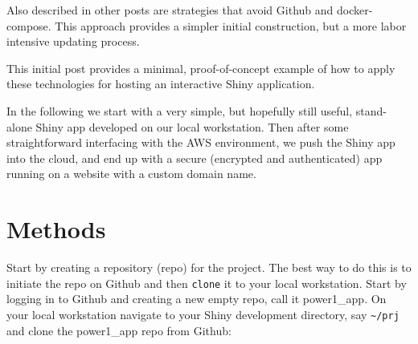 \documentclass[
  letterpaper,
  DIV=11,
  numbers=noendperiod,
  oneside]{scrartcl}
\begin{document}
Also described in other posts are strategies that avoid Github and
docker-compose. This approach provides a simpler initial construction,
but a more labor intensive updating process.

This initial post provides a minimal, proof-of-concept example of how to
apply these technologies for hosting an interactive Shiny application.

In the following we start with a very simple, but hopefully still
useful, stand-alone Shiny app developed on our local workstation. Then
after some straightforward interfacing with the AWS environment, we push
the Shiny app into the cloud, and end up with a secure (encrypted and
authenticated) app running on a website with a custom domain name.

\hypertarget{methods}{%
\section{Methods}\label{methods}}

Start by creating a repository (repo) for the project. The best way to
do this is to initiate the repo on Github and then \texttt{clone} it to
your local workstation. Start by logging in to Github and creating a new
empty repo, call it power1\_app. On your local workstation navigate to
your Shiny development directory, say \texttt{\textasciitilde{}/prj} and
clone the power1\_app repo from Github:
\end{document}
